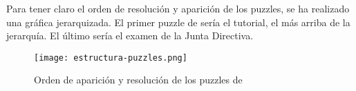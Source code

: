 Para tener claro el orden de resolución y aparición de los puzzles, se ha realizado una gráfica jerarquizada. El primer puzzle de \nombrejuego sería el tutorial, el más arriba de la jerarquía. El último sería el examen de la Junta Directiva.

\begin{figure}[H] 
	     \begin{center}
	         \texttt{[image: estructura-puzzles.png]}
	     \end{center}
	     \caption{Orden de aparición y resolución de los puzzles de \nombrejuego}
	     \label{fig:estructura-puzzles}
	\end{figure}